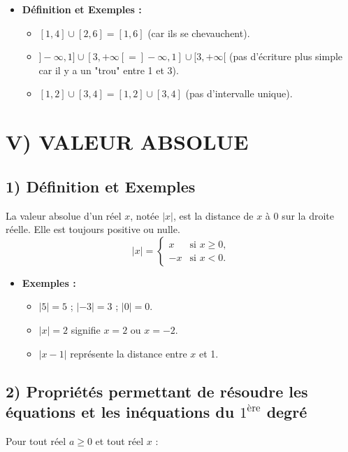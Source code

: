 \documentclass[12pt,a4paper]{article}
\begin{document}
\begin{itemize}
    \item \textbf{Définition et Exemples :}
    \begin{itemize}
        \item $[1, 4] \cup [2, 6] = [1, 6]$ (car ils se chevauchent).
        \item $]-\infty, 1] \cup [3, +\infty[ = ]-\infty, 1] \cup [3, +\infty[$ (pas d'écriture plus simple car il y a un "trou" entre 1 et 3).
        \item $[1, 2] \cup [3, 4] = [1, 2] \cup [3, 4]$ (pas d'intervalle unique).
    \end{itemize}
\end{itemize}


\section*{\color{myred} V) VALEUR ABSOLUE}

\subsection*{\color{myred} 1) Définition et Exemples}
La valeur absolue d'un réel $x$, notée $|x|$, est la distance de $x$ à 0 sur la droite réelle. Elle est toujours positive ou nulle.
\[
|x| =
\begin{cases}
x & \text{si } x \geq 0, \\
-x & \text{si } x < 0.
\end{cases}
\]

\begin{itemize}
    \item \textbf{Exemples :}
    \begin{itemize}
        \item $|5| = 5$ ; $|-3| = 3$ ; $|0| = 0$.
        \item $|x| = 2$ signifie $x = 2$ ou $x = -2$.
        \item $|x-1|$ représente la distance entre $x$ et 1.
    \end{itemize}
\end{itemize}

\subsection*{\color{myred} 2) Propriétés permettant de résoudre les équations et les inéquations du $1^{\text{ère}}$ degré}

Pour tout réel $a \geq 0$ et tout réel $x$ :
\end{document}
